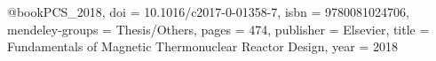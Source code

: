 @book{PCS_2018,
doi = {10.1016/c2017-0-01358-7},
isbn = {9780081024706},
mendeley-groups = {Thesis/Others},
pages = {474},
publisher = {Elsevier},
title = {{Fundamentals of Magnetic Thermonuclear Reactor Design}},
year = {2018}
}
